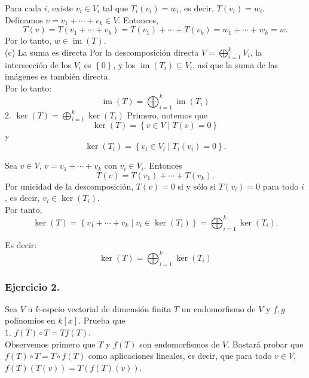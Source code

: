 \documentclass{article}
\theoremstyle{nonumberplain}
\begin{document}
Para cada \( i \), existe \( v_i \in V_i \) tal que \( T_i(v_i) = w_i \), es decir, \( T(v_i) = w_i \). \\

Definamos \( v = v_1 + \cdots + v_k \in V \). Entonces,
\[
T(v) = T(v_1 + \cdots + v_k) = T(v_1) + \cdots + T(v_k) = w_1 + \cdots + w_k = w.
\]
Por lo tanto, \( w \in \operatorname{im}(T) \). \\

 (c) La suma es directa
Por la descomposición directa \( V = \bigoplus_{i=1}^k V_i \), la intersección de los \( V_i \) es \(\left\{0\right\}\), y los \( \operatorname{im}(T_i) \subseteq V_i \), así que la suma de las imágenes es también directa. \\

Por lo tanto:
\[
\boxed{
\operatorname{im}(T) = \bigoplus_{i=1}^k \operatorname{im}(T_i)
}
\]
2. \( \operatorname{ker}(T)=\bigoplus_{i=1}^{k} \operatorname{ker}\left(T_{i}\right) \)
Primero, notemos que
\[
\operatorname{ker}(T) = \left\{ v \in V \mid T(v) = 0 \right\}
\]
y
\[
\operatorname{ker}(T_i) = \left\{ v_i \in V_i \mid T_i(v_i) = 0 \right\}.
\]

Sea \( v \in V \), \( v = v_1 + \cdots + v_k \) con \( v_i \in V_i \). Entonces
\[
T(v) = T(v_1) + \cdots + T(v_k).
\]
Por unicidad de la descomposición, \( T(v) = 0 \) si y sólo si \( T(v_i) = 0 \) para todo \( i \), es decir, \( v_i \in \operatorname{ker}(T_i) \). \\

Por tanto,
\[
\operatorname{ker}(T) = \left\{ v_1 + \cdots + v_k \mid v_i \in \operatorname{ker}(T_i) \right\} = \bigoplus_{i=1}^k \operatorname{ker}(T_i).
\]

Es decir:
\[
\boxed{
\operatorname{ker}(T) = \bigoplus_{i=1}^k \operatorname{ker}(T_i)
}
\]

\subsubsection*{Ejercicio 2.} Sea \( V \) u \( k \)-espcio vectorial de dimensión finita \( T \) un endomorfismo de \( V \) y \( f, g \) polinomios en \( k[x] \). Prueba que \\
1. \( f(T) \circ T=T f(T) \).\\
Observemos primero que \( T \) y \( f(T) \) son endomorfismos de \( V \). Bastará probar que \( f(T) \circ T = T \circ f(T) \) como aplicaciones lineales, es decir, que para todo \( v \in V \), \( f(T)(T(v)) = T(f(T)(v)) \).\\
\end{document}
